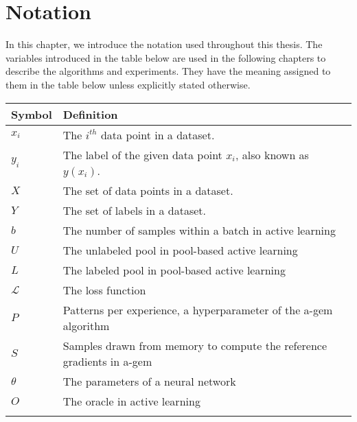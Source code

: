 \chapter{Notation}
\label{ch:notation}

In this chapter, we introduce the notation used throughout this thesis. The variables introduced in
the table below are used in the following chapters to describe the algorithms and experiments. They have
the meaning assigned to them in the table below unless explicitly stated otherwise.

\begin{tabularx}{\textwidth}{l X}
    \toprule
    Symbol & Definition \\
    \midrule
    $x_i$ & The $i^{th}$ data point in a dataset. \\ \addlinespace
    $y_i$ & The label of the given data point $x_i$, also known as $y(x_i)$. \\ \addlinespace
    $X$ & The set of data points in a dataset. \\ \addlinespace
    $Y$ & The set of labels in a dataset. \\ \addlinespace
    $b$ & The number of samples within a batch in active learning \\ \addlinespace
    $U$ & The unlabeled pool in pool-based active learning\\ \addlinespace
    $L$ & The labeled pool in pool-based active learning\\ \addlinespace
    $\mathcal{L}$ & The loss function \\ \addlinespace
    $P$ & Patterns per experience, a hyperparameter of the \gls{a-gem} algorithm \\ \addlinespace
    $S$ & Samples drawn from memory to compute the reference gradients in \gls{a-gem} \\ \addlinespace
    $\theta$ & The parameters of a neural network \\ \addlinespace
    $O$ & The oracle in active learning \\ \addlinespace
    \bottomrule
\end{tabularx}
\label{tab:notation}